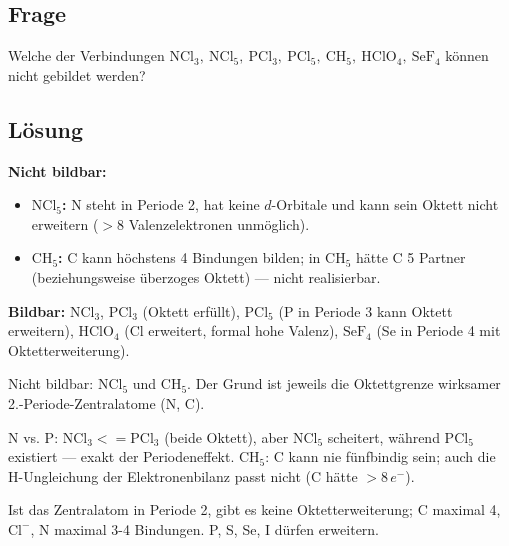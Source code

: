 
\subsection*{Frage}
Welche der Verbindungen $\mathrm{NCl_3,\ NCl_5,\ PCl_3,\ PCl_5,\ CH_5,\ HClO_4,\ SeF_4}$
können nicht gebildet werden?

\subsection*{Lösung}
\textbf{Nicht bildbar:}
\begin{itemize}
  \item \textbf{$\mathrm{NCl_5}$:} N steht in Periode 2, hat keine $d$-Orbitale
        und kann sein Oktett nicht erweitern ($>8$ Valenzelektronen unmöglich).
  \item \textbf{$\mathrm{CH_5}$:} C kann höchstens 4 Bindungen bilden; in
        $\mathrm{CH_5}$ hätte C 5 Partner (beziehungsweise überzoges
        Oktett) --- nicht realisierbar.
\end{itemize}
\textbf{Bildbar:} $\mathrm{NCl_3}$, $\mathrm{PCl_3}$ (Oktett erfüllt),
$\mathrm{PCl_5}$ (P in Periode 3 kann Oktett erweitern),
$\mathrm{HClO_4}$ (Cl erweitert, formal hohe Valenz), $\mathrm{SeF_4}$
(Se in Periode 4 mit Oktetterweiterung).

\begin{ergebnis}
Nicht bildbar: $\mathrm{NCl_5}$ und $\mathrm{CH_5}$. Der Grund ist jeweils die
Oktettgrenze wirksamer 2.-Periode-Zentralatome (N, C).
\end{ergebnis}

\begin{kontrolle}
N vs. P: $\mathrm{NCl_3}<=\mathrm{PCl_3}$ (beide Oktett), aber
$\mathrm{NCl_5}$ scheitert, während $\mathrm{PCl_5}$ existiert --- exakt der
Periodeneffekt. $\mathrm{CH_5}$: C kann nie fünfbindig sein; auch die
H-Ungleichung der Elektronenbilanz passt nicht (C hätte $>8\,e^-$).
\end{kontrolle}

\begin{merksatz}
Ist das Zentralatom in Periode 2, gibt es keine Oktetterweiterung; C maximal 4,
$\mathrm{Cl^-}$, N maximal 3-4 Bindungen. P, S, Se, I dürfen erweitern.
\end{merksatz}
